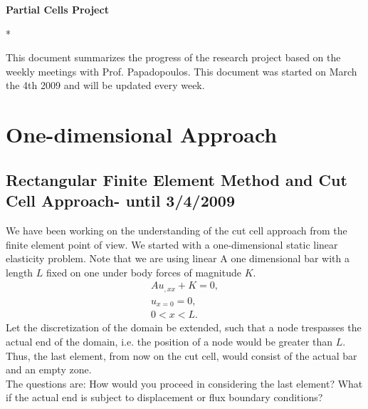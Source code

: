 \documentclass[a4paper,12pt]{article}
\newcounter{tabelle}
\begin{document}
\vspace{30mm}


\setcounter{tabelle}{0}
\begin{Huge}
\begin{center}
\textbf{Partial Cells Project}
\end{center}
\end{Huge}
\tableofcontents
\newpage
\listoftables
\newpage
\listoffigures
\newpage
\begin{section}*{}
\begin{center}
This document summarizes the progress of the research project based on the weekly meetings with Prof. Papadopoulos. This document was started on March the 4th 2009 and will be updated every week. 
\end{center}

\end{section}

\section{One-dimensional Approach}
\subsection{Rectangular Finite Element Method and Cut Cell Approach- until 3/4/2009}
We have been working on the understanding of the cut cell approach from the finite element point of view. We started with a one-dimensional static linear elasticity problem. Note that we are using linear 
A one dimensional bar with a length $L$ fixed on one under body forces of magnitude $K$.
\begin{eqnarray}\label{eqn:problem}
Au_{,xx} + K = 0,\\
u_{x=0} = 0,\\
0<x<L.
\end{eqnarray}
Let the discretization of the domain be extended, such that a node trespasses the actual end of the domain, i.e. the position of a node would be greater than $L$. Thus, the last element, from now on the cut cell, would consist of the actual bar and an empty zone.\\ 
The questions are: How would you proceed in considering the last element? What if the actual end is subject to displacement or flux boundary conditions?
\end{document}
